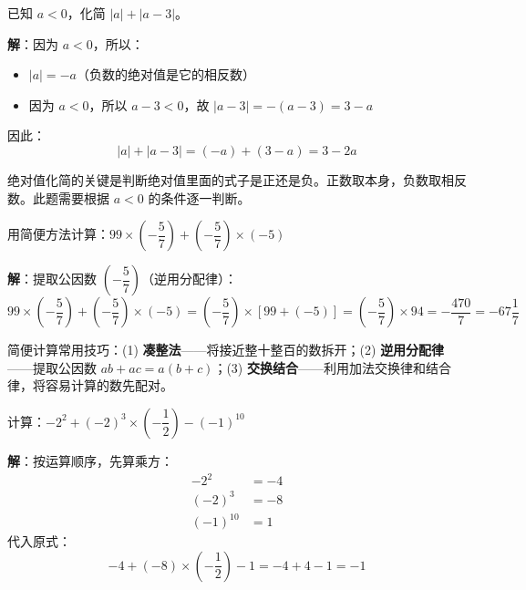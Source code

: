 \documentclass[12pt, a4paper]{ctexart}
\begin{document}
\vspace{6pt}

\begin{examplebox}[【例题4】绝对值的化简]
已知 $a < 0$，化简 $|a| + |a - 3|$。
\end{examplebox}

\textbf{解}：因为 $a < 0$，所以：
\begin{itemize}[leftmargin=*]
  \item $|a| = -a$（负数的绝对值是它的相反数）
  \item 因为 $a < 0$，所以 $a - 3 < 0$，故 $|a - 3| = -(a-3) = 3 - a$
\end{itemize}
因此：
\[
|a| + |a - 3| = (-a) + (3 - a) = 3 - 2a
\]

\begin{tipbox}[方法总结]
绝对值化简的关键是判断绝对值里面的式子是正还是负。正数取本身，负数取相反数。此题需要根据 $a < 0$ 的条件逐一判断。
\end{tipbox}

\vspace{6pt}

\begin{examplebox}
用简便方法计算：$99 \times \left(-\dfrac{5}{7}\right) + \left(-\dfrac{5}{7}\right) \times (-5)$
\end{examplebox}

\textbf{解}：提取公因数 $\left(-\dfrac{5}{7}\right)$（逆用分配律）：
\[
99 \times \left(-\frac{5}{7}\right) + \left(-\frac{5}{7}\right) \times (-5)
= \left(-\frac{5}{7}\right) \times [99 + (-5)]
= \left(-\frac{5}{7}\right) \times 94
= -\frac{470}{7}
= -67\frac{1}{7}
\]

\begin{tipbox}[方法总结]
简便计算常用技巧：(1) \textbf{凑整法}——将接近整十整百的数拆开；(2) \textbf{逆用分配律}——提取公因数 $ab + ac = a(b+c)$；(3) \textbf{交换结合}——利用加法交换律和结合律，将容易计算的数先配对。
\end{tipbox}

\vspace{6pt}

\begin{examplebox}[【例题6】混合运算综合]
计算：$-2^2 + (-2)^3 \times \left(-\dfrac{1}{2}\right) - (-1)^{10}$
\end{examplebox}

\textbf{解}：按运算顺序，先算乘方：
\begin{align*}
-2^2 &= -4 \\
(-2)^3 &= -8 \\
(-1)^{10} &= 1
\end{align*}
代入原式：
\[
-4 + (-8) \times \left(-\frac{1}{2}\right) - 1 = -4 + 4 - 1 = -1
\]
\end{document}
